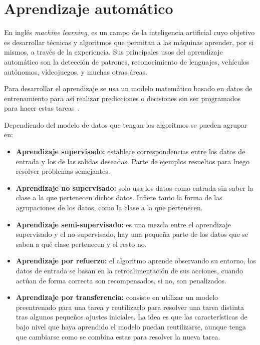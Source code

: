 
\section{Aprendizaje automático}

 En inglés \emph{machine learning}, es un campo de la inteligencia artificial cuyo objetivo es desarrollar técnicas y algoritmos que permitan a las máquinas aprender, por si mismos, a través de la experiencia. Sus principales usos del aprendizaje automático son la detección de patrones, reconocimiento de lenguajes, vehículos autónomos, vídeojuegos, y muchas otras áreas. 
    
 Para desarrollar el aprendizaje se usa un modelo matemático basado en datos de entrenamiento para así realizar predicciones o decisiones sin ser programados para hacer estas tareas~\cite{ Zhang2020}.
    
 Dependiendo del modelo de datos que tengan los algoritmos se pueden agrupar en:
 
 \begin{itemize}
 
  \item \textbf{Aprendizaje supervisado:} establece correspondencias entre los datos de entrada y los de las salidas deseadas. Parte de ejemplos resueltos para luego resolver problemas semejantes.
  
  \item \textbf{Aprendizaje no supervisado:} solo usa los datos como entrada sin saber la clase a la que pertenecen dichos datos. Infiere tanto la forma de las agrupaciones de los datos, como la clase a la que pertenecen.
  
  \item \textbf{Aprendizaje semi-supervisado:} es una mezcla entre el aprendizaje supervisado y el no supervisado, hay una pequeña parte de los datos que se saben a qué clase pertenecen y el resto no.
  
  \item \textbf{Aprendizaje por refuerzo:} el algoritmo aprende observando su entorno, los datos de entrada se basan en la retroalimentación de sus acciones, cuando actúan de forma correcta son recompensados, si no, son penalizados.
  
  \item \textbf{Aprendizaje por transferencia:} consiste en utilizar un modelo preentrenado para una tarea y reutilizarlo para resolver una tarea distinta tras algunos pequeños ajustes iniciales. La idea es que las características de bajo nivel que haya aprendido el modelo puedan reutilizarse, aunque tenga que cambiarse como se combina estas para resolver la nueva tarea. 
  
 \end{itemize}

